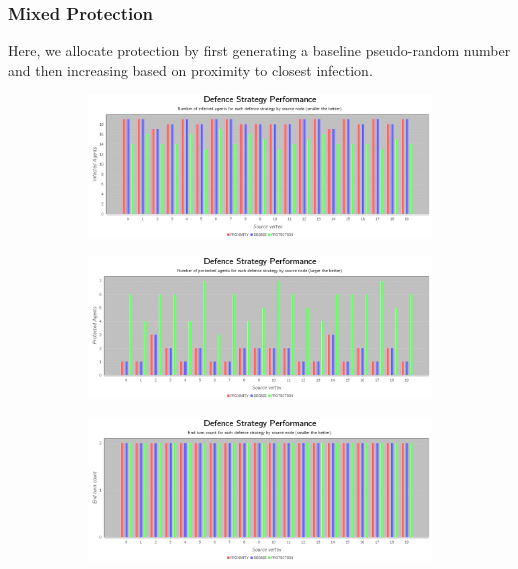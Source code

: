\documentclass[results.tex]{subfiles}
\begin{document}
\newpage

\subsubsection{Mixed Protection}

Here, we allocate protection by first generating a baseline pseudo-random number and then increasing based on proximity to closest infection.



\newpage

\begin{figure}[!ht]
\centering
     \begin{subfigure}[b]{0.9\textwidth}
         \centering
         \includegraphics[width=\textwidth]{Complete/Mixed/MixedInfectedChart}
         \label{fig:com-mix-infected}
     \end{subfigure}
     \vfill
     \begin{subfigure}[b]{0.9\textwidth}
         \centering
         \includegraphics[width=\textwidth]{Complete/Mixed/MixedProtectedChart}
         \label{fig:com-mix-protected}
     \end{subfigure}
     \vfill
     \begin{subfigure}[b]{0.9\textwidth}
         \centering
         \includegraphics[width=\textwidth]{Complete/Mixed/MixedEndTurnChart}

\end{subfigure}
\end{figure}
\end{document}
